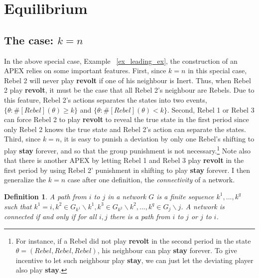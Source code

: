 \documentclass[12pt,letter]{article}
\newtheorem{definition}{Definition}[section]
\theoremstyle{definition}
\theoremstyle{remark}
\theoremstyle{claim}
\begin{document}
\section{Equilibrium}
\label{sec:equilibrium}
\subsection{The case: $k=n$}

In the above special case, Example ~\ref{ex_leading_ex}, the construction of an APEX relies on some important features. First, since $k=n$ in this special case, Rebel 2 will never play \textbf{revolt} if one of his neighbour is Inert. Thus, when Rebel 2 play \textbf{revolt}, it must be the case that all Rebel 2's neighbour are Rebels. Due to this feature, Rebel 2's actions separates the states into two events, $\{\theta: \#[Rebel](\theta)\geq k\}$ and $\{\theta: \#[Rebel](\theta)< k\}$. Second, Rebel 1 or Rebel 3 can force Rebel 2 to play \textbf{revolt} to reveal the true state in the first period since only Rebel 2 knows the true state and Rebel 2's action can separate the states. Third, since $k=n$, it is easy to punish a deviation by only one Rebel's shifting to play \textbf{stay} forever, and so that the group punishment is not necessary.\footnote{For instance, if a Rebel did not play \textbf{revolt} in the second period in the state $\theta=(Rebel,Rebel,Rebel)$, his neighbour can play \textbf{stay} forever. To give incentive to let such neighbour play \textbf{stay}, we can just let the deviating player also play \textbf{stay}.} Note also that there is another APEX by letting Rebel 1 and Rebel 3 play \textbf{revolt} in the first period by using Rebel 2' punishment in shifting to play \textbf{stay} forever. I then generalize the $k=n$ case after one definition, the \textit{connectivity} of a network.

\begin{definition}
A path from $i$ to $j$ in a network $G$ is a finite sequence $k^1,...,k^q$ such that $k^1=i, k^2\in G_{k^1}\backslash k^1, k^3\in G_{k^2}\backslash k^2,...,k^q\in G_j\backslash j$. A network is connected if and only if for all $i,j$ there is a path from $i$ to $j$ or $j$ to $i$. 
\end{definition}
\end{document}
